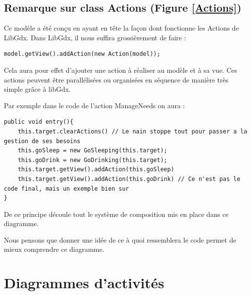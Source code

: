 \documentclass[a4paper]{report}
\begin{document}
\clearpage

\subsection*{Remarque sur class Actions (Figure \ref{Actions})\\}

Ce modèle a été conçu en ayant en tête la façon dont fonctionne les \og Actions \fg de LibGdx. Dans LibGdx, il nous suffira grossièrement de faire :

\vspace{0.5cm}

\begin{lstlisting}
model.getView().addAction(new Action(model));
\end{lstlisting}

\vspace{0.5cm}

Cela aura pour effet d'ajouter une action à réaliser au modèle et à sa vue.
Ces actions peuvent être parallélisées ou organisées en séquence de manière très simple grâce à libGdx.

Par exemple dans le code de l'action ManageNeeds on aura :

\vspace{0.5cm}

\begin{lstlisting}
public void entry(){
	this.target.clearActions() // Le nain stoppe tout pour passer a la gestion de ses besoins
	this.goSleep = new GoSleeping(this.target);
	this.goDrink = new GoDrinking(this.target);
	this.target.getView().addAction(this.goSleep)
	this.target.getView().addAction(this.goDrink) // Ce n'est pas le code final, mais un exemple bien sur
}
\end{lstlisting}


\vspace{0.5cm}

De ce principe découle tout le système de composition mis en place dans ce diagramme.\\

\vspace{0.4cm}

 Nous pensons que donner une idée de ce à quoi ressemblera le code permet de mieux comprendre ce diagramme.

\clearpage
\section*{Diagrammes d'activités}
\end{document}
